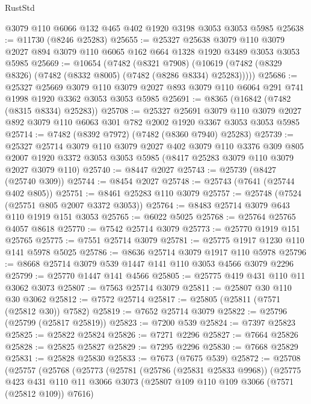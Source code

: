 \begin{lexlean}{RustStd}
\begin{coremodule}
{\begin{coremodule}
{{{{{{{{{{{{{{{{{{{{{{{{{{{{{{{{    @3079
    @110
    @6066
    @132
    @465
    @402
    @1920
    @3198
    @3053
    @3053
    @5985
@25638 := @11730 (@8246 @25283)
@25655 := @25327
    @25638
    @3079
    @110
    @3079
    @2027
    @894
    @3079
    @110
    @6065
    @162
    @664
    @1328
    @1920
    @3489
    @3053
    @3053
    @5985
@25669 := @10654
    (@7482
      (@8321 @7908)
      (@10619 (@7482 (@8329 @8326) (@7482 (@8332 @8005) (@7482 (@8286 @8334) @25283)))))
@25686 := @25327
    @25669
    @3079
    @110
    @3079
    @2027
    @893
    @3079
    @110
    @6064
    @291
    @741
    @1998
    @1920
    @3362
    @3053
    @3053
    @5985
@25691 := @8365 (@16842 (@7482 (@8315 @8334) @25283))
@25708 := @25327
    @25691
    @3079
    @110
    @3079
    @2027
    @892
    @3079
    @110
    @6063
    @301
    @782
    @2002
    @1920
    @3367
    @3053
    @3053
    @5985
@25714 := @7482 (@8392 @7972) (@7482 (@8360 @7940) @25283)
@25739 := @25327
    @25714
    @3079
    @110
    @3079
    @2027
    @402
    @3079
    @110
    @3376
    @309
    @805
    @2007
    @1920
    @3372
    @3053
    @3053
    @5985
    (@8417 @25283 @3079 @110 @3079 @2027 @3079 @110)
@25740 := @8447 @2027
@25743 := @25739 (@8427 (@25740 @309))
@25744 := @8454 @2027
@25748 := @25743 (@7641 (@25744 @402 @805))
@25751 := @8461 @25283 @110 @3079
@25757 := @25748 (@7524 (@25751 @805 @2007 @3372 @3053))
@25764 := @8483 @25714 @3079 @643 @110 @1919 @151 @3053
@25765 := @6022 @5025
@25768 := @25764 @25765 @4057 @8618
@25770 := @7542 @25714 @3079
@25773 := @25770 @1919 @151 @25765
@25775 := @7551 @25714 @3079
@25781 := @25775 @1917 @1230 @110 @141 @5978 @5025
@25786 := @8636 @25714 @3079 @1917 @110 @5978
@25796 := @8668 @25714 @3079 @539 @1447 @141 @110 @3053 @4566 @3079 @2296
@25799 := @25770 @1447 @141 @4566
@25805 := @25775 @419 @431 @110 @11 @3062 @3073
@25807 := @7563 @25714 @3079
@25811 := @25807 @30 @110 @30 @3062
@25812 := @7572 @25714
@25817 := @25805 (@25811 (@7571 (@25812 @30)) @7582)
@25819 := @7652 @25714 @3079
@25822 := @25796 (@25799 (@25817 @25819))
@25823 := @7200 @539
@25824 := @7397 @25823
@25825 := @25822 @25824
@25826 := @7271 @2296
@25827 := @7664 @25826
@25828 := @25825 @25827
@25829 := @7295 @2296
@25830 := @7668 @25829
@25831 := @25828 @25830
@25833 := @7673 (@7675 @539)
@25872 := @25708
    (@25757
      (@25768
        (@25773
          (@25781
            (@25786 (@25831 @25833 @9968))
            (@25775
              @423
              @431
              @110
              @11
              @3066
              @3073
              (@25807 @109 @110 @109 @3066 (@7571 (@25812 @109)) @7616)
}}}}}}}}}}}}}}}}}}}}}}}}}}}}}}}}
\end{coremodule}}
\end{coremodule}
\end{lexlean}
